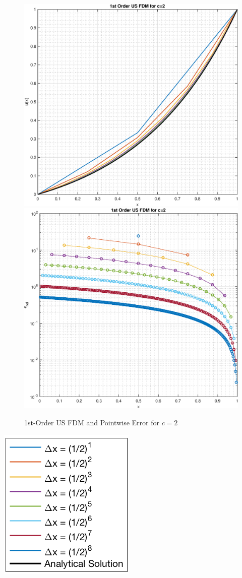 \documentclass[10pt, reqno]{article}		%
\numberwithin{equation}{section}
\begin{document}
\begin{figure}[H]
	\begin{center}
		\includegraphics[width = 0.49\linewidth]{solution_1st_order_us_c_2}
		\includegraphics[width = 0.49\linewidth]{pointwise_error_1st_order_us_c_2}
		\caption{1st-Order US FDM and Pointwise Error for $c = 2$}
	\end{center}
\end{figure}

\begin{center}
	\includegraphics[height = 0.17\linewidth]{legend}
\end{center}

\newpage
\end{document}
